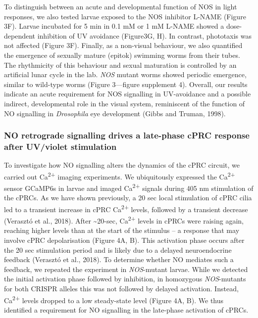 \documentclass[
  11pt,
  letterpaper,
  DIV=11,
  numbers=noendperiod]{scrartcl}
\begin{document}
To distinguish between an acute and developmental function of NOS in
light responses, we also tested larvae exposed to the NOS inhibitor
L-NAME (Figure 3F). Larvae incubated for 5 min in 0.1 mM or 1 mM L-NAME
showed a dose-dependent inhibition of UV avoidance (Figure3G, H). In
contrast, phototaxis was not affected (Figure 3F). Finally, as a
non-visual behaviour, we also quantified the emergence of sexually
mature (epitok) swimming worms from their tubes. The rhythmicity of this
behaviour and sexual maturation is controlled by an artificial lunar
cycle in the lab. \emph{NOS} mutant worms showed periodic emergence,
similar to wild-type worms (Figure 3---figure supplement 4). Overall,
our results indicate an acute requirement for NOS signalling in
UV-avoidance and a possible indirect, developmental role in the visual
system, reminiscent of the function of NO signalling in
\emph{Drosophila} eye development (Gibbs and Truman, 1998).

\subsubsection{NO retrograde signalling drives a late-phase cPRC
response after UV/violet
stimulation}\label{no-retrograde-signalling-drives-a-late-phase-cprc-response-after-uvviolet-stimulation}

To investigate how NO signalling alters the dynamics of the cPRC
circuit, we carried out Ca\textsuperscript{2+} imaging experiments. We
ubiquitously expressed the Ca\textsuperscript{2+} sensor GCaMP6s in
larvae and imaged Ca\textsuperscript{2+} signals during 405 nm
stimulation of the cPRCs. As we have shown previously, a 20 sec local
stimulation of cPRC cilia led to a transient increase in cPRC
Ca\textsuperscript{2+} levels, followed by a transient decrease
(Verasztó et al., 2018). After \textasciitilde20-sec,
Ca\textsuperscript{2+} levels in cPRCs were raising again, reaching
higher levels than at the start of the stimulus -- a response that may
involve cPRC depolarisation (Figure 4A, B). This activation phase occurs
after the 20 sec stimulation period and is likely due to a delayed
neuroendocrine feedback (Verasztó et al., 2018). To determine whether NO
mediates such a feedback, we repeated the experiment in
\emph{NOS}-mutant larvae. While we detected the initial activation phase
followed by inhibition, in homozygous \emph{NOS}-mutants for both CRISPR
alleles this was not followed by delayed activation. Instead,
Ca\textsuperscript{2+} levels dropped to a low steady-state level
(Figure 4A, B). We thus identified a requirement for NO signalling in
the late-phase activation of cPRCs.
\end{document}
